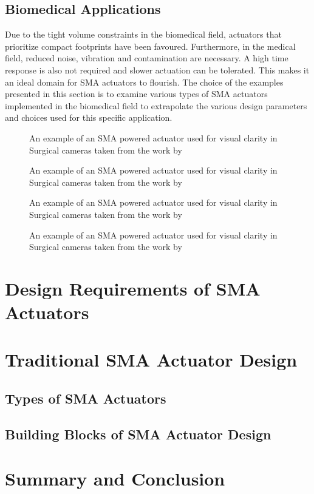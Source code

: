 \subsection{Biomedical Applications}
Due to the tight volume constraints in the biomedical field, actuators that prioritize compact footprints have been favoured. Furthermore, in the medical field, reduced noise, vibration and contamination are necessary. A high time response is also not required and slower actuation can be tolerated. This makes it an ideal domain for SMA actuators to flourish. The choice of the examples presented in this section is to examine various types of SMA actuators implemented in the biomedical field to extrapolate the various design parameters and choices used for this specific application.
\begin{figure}[hbt!]
    \centering
    
    \caption{An example of an SMA powered actuator used for visual clarity in Surgical cameras taken from the work by \todocite}
    \label{fig:biomed-examples}
\end{figure}

\begin{figure}[hbt!]
    \centering
    
    \caption{An example of an SMA powered actuator used for visual clarity in Surgical cameras taken from the work by \todocite}
    \label{fig:auto-examples}
\end{figure}

\begin{figure}[hbt!]
    \centering
    
    \caption{An example of an SMA powered actuator used for visual clarity in Surgical cameras taken from the work by \todocite}
    \label{fig:industrial-examples}
\end{figure}

\begin{figure}[hbt!]
    \centering
    
    \caption{An example of an SMA powered actuator used for visual clarity in Surgical cameras taken from the work by \todocite}
    \label{fig:bio-examples}
\end{figure}

\section{Design Requirements of SMA Actuators}
\section{Traditional SMA Actuator Design}
\subsection{Types of SMA Actuators}
\subsection{Building Blocks of SMA Actuator Design}
\section{Summary and Conclusion}

